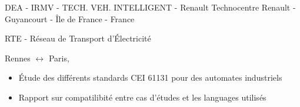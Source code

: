 \documentclass[11pt,a4paper,sans]{moderncv}
\newif\ifportuguese
\newif\iffrench
\newif\ifenglish
\newcommand\ml[3]{\ifenglish    {#1}\fi
  \ifportuguese {#2}\fi
  \iffrench     {#3}\fi}
\begin{document}
{
  \ml%
  {Engineering Internship}
  {Estágio Engenheiro 3º Ano - Fim de Estudos}
  {Stage Ingénieur $\mathbf{3^{ème}} $ Année - Fin d'études}}
{\newline DEA - IRMV - TECH. VEH. INTELLIGENT - Renault}
{\newline Technocentre Renault - Guyancourt - Île de France - France}
{\newline
  \ml%
  {Development of supervision system for autonomous vehicle}
  {Desenvolvimento de sistema de supervisão para veículo autônomo}
  {Développement d'un système de supervision pour véhicule autonome}}
{\ml%
  {
    \begin{itemize}
    \item Interface ROS/Simulink using C++, Python and Matlab/Simulink
    \item State machine using Stateflow
    \end{itemize}
  }
  {
    \begin{itemize}
    \item Interface ROS/Simulink usando C++, Python e Matlab/Simulink
    \item Máquina de estados utilisando Stateflow
    \end{itemize}
  }
  {
    \begin{itemize}
    \item Interface ROS/Simulink utilisant C++, Python et Matlab/Simulink
    \item Machine à états utilisant Stateflow
    \end{itemize}
}
}

{
  \ml%
  {Industrial Study Project}
  {Projeto de Estudo Industrial}
  {Projet d'Étude Industriel}}
{\newline RTE - Réseau de Transport d'Électricité}
{\newline Rennes $\leftrightarrow$ Paris,\ml{France}{França}{France}}
{\newline
  \ml%
  {Development and validation of automaton to optimize the insertion of Renewable Energies}
  {Desenvolvimento e validação de um autômato para otimizar a inserção
    de Energias Renováveis}
  {Développement et validation d'un automate pour optimiser
    l'insertion des Énergies Renouvelables}}
{
  \begin{itemize}
    \item Étude des différents standards CEI 61131 pour des automates industriels
    \item Rapport sur compatilibité entre cas d'études et les languages utilisés
  \end{itemize}
}
\end{document}

